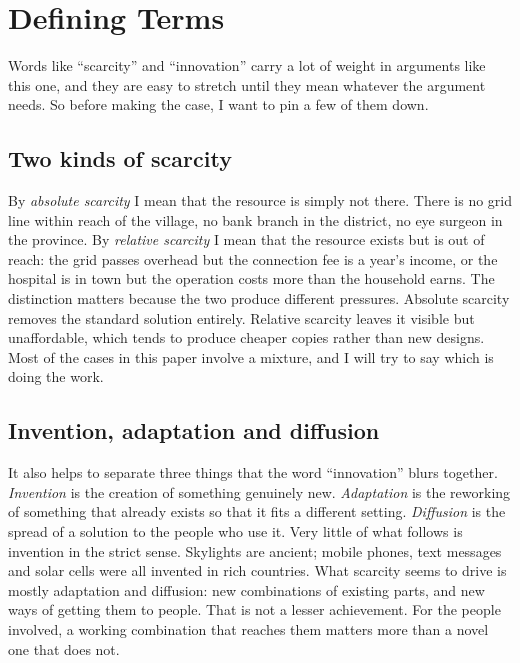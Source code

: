 \section{Defining Terms}
\label{sec:terms}

Words like ``scarcity'' and ``innovation'' carry a lot of weight in arguments
like this one, and they are easy to stretch until they mean whatever the
argument needs. So before making the case, I want to pin a few of them down.

\subsection{Two kinds of scarcity}

By \emph{absolute scarcity} I mean that the resource is simply not there. There
is no grid line within reach of the village, no bank branch in the district, no
eye surgeon in the province. By \emph{relative scarcity} I mean that the
resource exists but is out of reach: the grid passes overhead but the
connection fee is a year's income, or the hospital is in town but the
operation costs more than the household earns. The distinction matters because
the two produce different pressures. Absolute scarcity removes the standard
solution entirely. Relative scarcity leaves it visible but unaffordable, which
tends to produce cheaper copies rather than new designs. Most of the cases in
this paper involve a mixture, and I will try to say which is doing the work.

\subsection{Invention, adaptation and diffusion}

It also helps to separate three things that the word ``innovation'' blurs
together. \emph{Invention} is the creation of something genuinely new.
\emph{Adaptation} is the reworking of something that already exists so that it
fits a different setting. \emph{Diffusion} is the spread of a solution to the
people who use it. Very little of what follows is invention in the strict
sense. Skylights are ancient; mobile phones, text messages and solar cells were
all invented in rich countries. What scarcity seems to drive is mostly
adaptation and diffusion: new combinations of existing parts, and new ways of
getting them to people. That is not a lesser achievement. For the people
involved, a working combination that reaches them matters more than a novel
one that does not.

